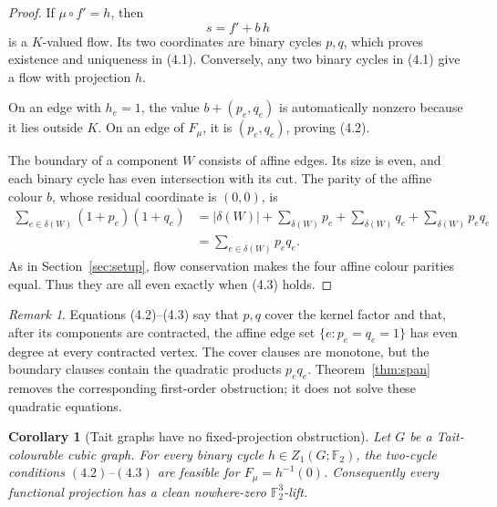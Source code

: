 \documentclass[11pt]{article}
\newtheorem{corollary}[theorem]{Corollary}
\theoremstyle{definition}
\theoremstyle{remark}
\newtheorem{remark}[theorem]{Remark}
\newcommand{\F}{\mathbb F}
\begin{document}
\begin{proof}
If \(\mu\circ f'=h\), then
\[
                        s=f'+b\,h
\]
is a \(K\)-valued flow.  Its two coordinates are binary cycles \(p,q\),
which proves existence and uniqueness in (4.1).  Conversely, any two
binary cycles in (4.1) give a flow with projection \(h\).

On an edge with \(h_e=1\), the value \(b+(p_e,q_e)\) is automatically
nonzero because it lies outside \(K\).  On an edge of \(F_\mu\), it is
\((p_e,q_e)\), proving (4.2).

The boundary of a component \(W\) consists of affine edges.  Its size is
even, and each binary cycle has even intersection with its cut.  The
parity of the affine colour \(b\), whose residual coordinate is
\((0,0)\), is
\[
\begin{aligned}
\sum_{e\in\delta(W)}(1+p_e)(1+q_e)
 &=|\delta(W)|+\sum_{\delta(W)}p_e+\sum_{\delta(W)}q_e
      +\sum_{\delta(W)}p_eq_e\\
 &=\sum_{e\in\delta(W)}p_eq_e.
\end{aligned}                                           \tag{4.4}
\]
As in Section~\ref{sec:setup}, flow conservation makes the four affine
colour parities equal.  Thus they are all even exactly when (4.3)
holds.
\end{proof}

\begin{remark}
Equations (4.2)--(4.3) say that \(p,q\) cover the kernel factor and
that, after its components are contracted, the affine edge set
\(\{e:p_e=q_e=1\}\) has even degree at every contracted vertex.
The cover clauses are monotone, but the boundary clauses contain the
quadratic products \(p_eq_e\).  Theorem~\ref{thm:span} removes the
corresponding first-order obstruction; it does not solve these quadratic
equations.
\end{remark}

\begin{corollary}[Tait graphs have no fixed-projection obstruction]
\label{cor:tait}
Let \(G\) be a Tait-colourable cubic graph.  For every binary cycle
\(h\in Z_1(G;\F_2)\), the two-cycle conditions
\((4.2)\)--\((4.3)\) are feasible for \(F_\mu=h^{-1}(0)\).
Consequently every functional projection has a clean nowhere-zero
\(\F_2^3\)-lift.
\end{corollary}
\end{document}
